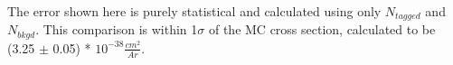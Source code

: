 \documentclass[12pt]{article}
\begin{document}
The error shown here is purely statistical and calculated using only $N_{tagged}$ and $N_{bkgd}$. This comparison is within 1$\sigma$ of the MC cross section, calculated to be (3.25 $\pm$ 0.05) * $10^{-38} \frac{cm^2}{Ar}$.






%
\end{document}
